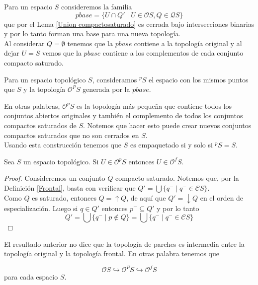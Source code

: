 Para un espacio $S$ consideremos la familia 
\[
pbase=\{U\cap Q'\mid U\in \mathcal{O}S, Q\in \mathcal{Q}S\}
\]
que por el Lema \ref{Union compactosaturado} es cerrada bajo intersecciones binarias y por lo tanto forman una base para una nueva topología.\\

Al considerar $Q=\emptyset$ tenemos que la $pbase$ contiene a la topología original y al dejar $U=S$ vemos que la $pbase$ contiene a los complementos de cada conjunto compacto saturado.

\begin{dfn}
    Para un espacio topológico $S$, consideramos $^pS$ el espacio con los mismos puntos que $S$ y la topología $\mathcal{O}^PS$ generada por la $pbase$.
\end{dfn}

En otras palabras, $\mathcal{O}^pS$ es la topología más pequeña que contiene todos los conjuntos abiertos originales y también el complemento de todos los conjuntos compactos saturados de $S$. Notemos que hacer esto puede crear nuevos conjuntos compactos saturados que no son cerrados en $S$.\\

Usando esta construcción tenemos que $S$ es empaquetado si y solo si $^pS=S$.

\begin{lem}
    Sea $S$ un espacio topológico. Si $U\in \mathcal{O}^pS$ entonces $U\in\mathcal{O}^fS$.
\end{lem}

\begin{proof}
    Consideremos un conjunto $Q$ compacto saturado. Notemos que, por la Definición \ref{Frontal}, basta con verificar que $Q'=\bigcup\{q^-\mid q^-\in \mathcal{C}S\}$.\\

    Como $Q$ es saturado, entonces $Q=\uparrow Q$, de aquí que $Q'=\downarrow Q$ en el orden de especialización. Luego si $q\in Q'$ entonces $p^-\subseteq Q'$ y por lo tanto 
    \[
    Q'=\bigcup\{q^-\mid p\notin Q\}=\bigcup\{q^-\mid q^-\in \mathcal{C}S\}
    \]
\end{proof}

El resultado anterior no dice que la topología de parches es intermedia entre la topología original y la topología frontal. En otras palabra tenemos que

\[
\mathcal{O}S \hookrightarrow \mathcal{O}^PS \hookrightarrow \mathcal{O}^fS
\]
para cada espacio $S$.\\

